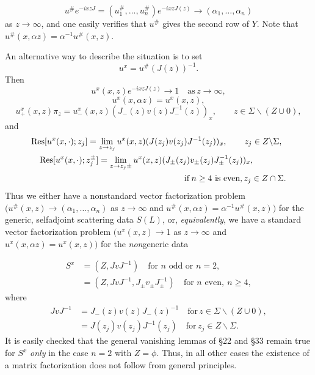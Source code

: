 \documentclass{surv-l}
\theoremstyle{plain}
\theoremstyle{definition}
\numberwithin{equation}{chapter}
\begin{document}
\begin{equation*}
u^{\#}e^{-ixzJ}= (u_{1}^{\#},\ldots,u_{n}^{\#})e^{-ixzJ(z)}\rightarrow(\alpha_{1},\ldots,\alpha_{n})
\end{equation*}
as $ z\rightarrow\infty$, and one easily verifies that $ u^{\#}$ gives the second row of $Y$. Note that $u^{\#}(x,\alpha z)=\alpha^{-1} u^{\#}(x, z)$.

An alternative way to describe the situation is to set
\begin{equation}\label{eq38.13}
u^{x}=u^{\#}(J(z))^{-1}.
\end{equation}
Then
\begin{equation}\label{eq38.14}
u^{x}(x, z)e^{-ixzJ(z)}\rightarrow 1 \quad  \mathrm{as}\,z\rightarrow\infty,
\end{equation}
\begin{equation}\label{eq38.15}
u^{x}(x, \alpha z)=u^{x}(x, z),
\end{equation}
\begin{equation}\label{eq38.16}
u_{+}^{x}(x,z)\pi_{z}=u_{-}^{x}(x, z)(J_{-}(z)v(z)J_{-}^{-1}(z))_{x}, \qquad  z\in\Sigma\backslash (Z\cup 0),
\end{equation}
and
\begin{align}\label{eq38.17}
&\mathrm{Res}[u^{x}(x,\cdot);z_{j}]=\lim_{z\rightarrow z_{j}}u^{x}(x, z)(J(z_{j})v(z_{j})J^{-1}(z_{j}))_{x},\qquad  z_{j}\in Z\backslash \Sigma, \\
&\quad\mathrm{Res}[u^{x}(x,\cdot);z_{j}^{\pm}]=\lim_{z\rightarrow z_{j}\pm}u^{x}(x,z)(J_{\pm}(z_{j})v_{\pm}(z_{j})J_{\pm}^{-1}(z_{j}))_{x},\notag \\
& \qquad \qquad \qquad \qquad \qquad  \qquad \qquad \qquad \qquad\mathrm{if} \,n\geq 4 \text{ is even},  z_{j}\in Z\cap\Sigma.\notag
\end{align}
Thus we either have a nonstandard vector factorization problem $(u^{\#} (x,z)\rightarrow (\alpha_{1},\ldots,\alpha_{n})$ as $ z\rightarrow\infty$ and $u^{\#}(x,\alpha z)=\alpha^{-1}u^{\#}(x, z))$ for the generic, selfadjoint scattering data $S(L)$, or, \emph{equivalently}, we have a standard vector factorization problem $(u^{x}(x, z)\rightarrow 1$ as $ z\rightarrow\infty$ and $u^{x}(x, \alpha z)=u^{x}(x, z))$ for the \emph{non}generic data

\begin{align*}
S^{x}&=(Z, JvJ^{-1})\quad\text{for }n \text{ odd or } n=2,\\
&=(Z, JvJ^{-1}, J_{\pm} v_{\pm} J_{\pm}^{-1}) \quad  \text{for $n$ even},\ n\geq 4,
\end{align*}
where
\begin{align*}
JvJ^{-1}& =J_{-}(z)v(z)J_{-}(z)^{-1} \quad \mathrm{for}\, z\in\Sigma\backslash (Z\cup 0),\\
& =J(z_{j})v(z_{j})J^{-1}(z_{j})\quad  \mathrm{for}\,  z_{j}\in Z\backslash \Sigma.
\end{align*}
It is easily checked that the general vanishing lemmas of \S 22 and \S 33 remain true for $S^{x}$ \emph{only} in the case $n =2$ with $ Z=\phi$. Thus, in all other cases the existence of a matrix factorization does not follow from general principles.
\end{document}
